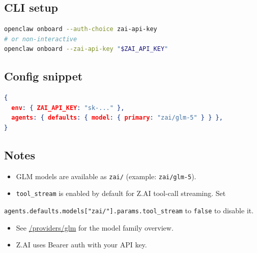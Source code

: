 \subsection{CLI setup}


\begin{lstlisting}[language=bash]
openclaw onboard --auth-choice zai-api-key
# or non-interactive
openclaw onboard --zai-api-key "$ZAI_API_KEY"
\end{lstlisting}


\subsection{Config snippet}


\begin{lstlisting}[language=json]
{
  env: { ZAI_API_KEY: "sk-..." },
  agents: { defaults: { model: { primary: "zai/glm-5" } } },
}
\end{lstlisting}


\subsection{Notes}


\begin{itemize}
  \item GLM models are available as \texttt{zai/} (example: \texttt{zai/glm-5}).
  \item \texttt{tool\_stream} is enabled by default for Z.AI tool-call streaming. Set
\end{itemize}

\texttt{agents.defaults.models["zai/"].params.tool\_stream} to \texttt{false} to disable it.
\begin{itemize}
  \item See \href{/providers/glm}{/providers/glm} for the model family overview.
  \item Z.AI uses Bearer auth with your API key.
\end{itemize}



\clearpage
